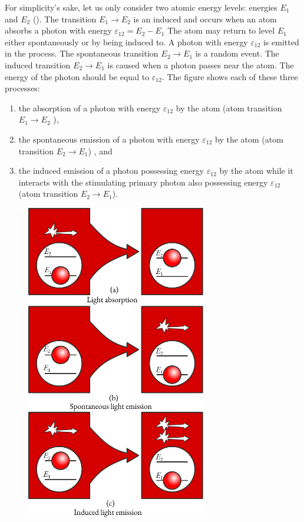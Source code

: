 For simplicity's sake, let us only consider two atomic energy levels:
energies $E_{1}$ and $E_{2}$ (). The transition $E_{1} \to E_{2}$ is an induced and occurs when an atom absorbs a photon with energy $\varepsilon_{12} = E_{2} - E_{1}$ The atom may return to level $E_{1}$ either spontaneously or by being induced to. A photon with energy $\varepsilon_{12}$ is emitted in the process. The spontaneous transition $E_{2} \to E_{1}$ is a random event. The induced transition $E_{2} \to E_{1}$ is caused when a photon passes near the atom. The energy of the photon should be equal to $\varepsilon_{12}$. The figure shows each of these three processes: 

\begin{enumerate}[label=(\alph*),noitemsep,nolistsep]
\item the absorption of a photon with energy $\varepsilon_{12}$ by the atom (atom transition  $E_{1} \to E_{2}$ ), 
\item the spontaneous emission of a photon with energy $\varepsilon_{12}$ by the atom (atom transition $E_{2} \to E_{1}$) , and
\item the induced emission of a photon possessing energy $\varepsilon_{12}$ by the atom while it interacts with the stimulating primary photon also possessing energy $\varepsilon_{12}$ (atom transition $E_{2} \to E_{1}$).
\end{enumerate}

\begin{figure}[!ht]
\centering
\includegraphics[width=0.7\textwidth]{figures/emission.pdf}
\end{figure}


